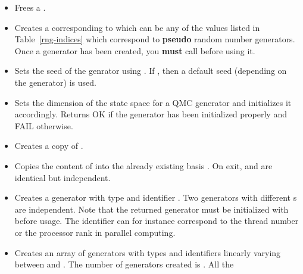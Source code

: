 \begin{itemize}
\item {}
  \sshortdescribe Frees a .
\item {}
  \sshortdescribe Creates a  corresponding to 
  which can be any of the values  listed in
  Table~\ref{rng-indices} which correspond to {\bf pseudo} random number generators.
  Once a generator has been created, you {\bf must} call
   before using it. 
\item {}
  \sshortdescribe Sets the seed of the genrator  using . If
  , then a default seed (depending on the generator) is used.
\item {}
  \sshortdescribe Sets the dimension of the state space for a QMC generator and
  initializes it accordingly.  Returns OK if the generator has been initialized
  properly and FAIL otherwise.
\item {}
  \sshortdescribe Creates a copy of .
\item {}
  \sshortdescribe Copies the content of  into the already existing
  basis . On exit,  and  are identical but
  independent. 
\item {}
  \sshortdescribe Creates a generator with type  and identifier
  . Two generators with different s are independent. Note that
  the returned generator must be initialized with  before
  usage. The identifier  can for instance correspond to the thread
  number or the processor rank in parallel computing.
\item {}
  \sshortdescribe Creates an array of generators with types 
  and identifiers linearly varying between  and . The
  number of generators created is . All the

\end{itemize}
